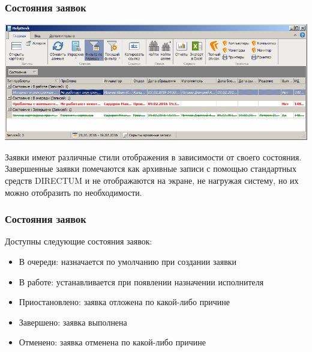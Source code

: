 \documentclass{../industrial-development}
\begin{document}
\begin{frame} \frametitle{Состояния заявок}
\centerline{\includegraphics[width=\textwidth]{pic5.png}}
\end{frame}
\lecturenotes
Заявки имеют различные стили отображения в зависимости от своего состояния. Завершенные заявки помечаются как архивные записи с помощью стандартных средств DIRECTUM и не отображаются на экране, не нагружая систему, но их можно отобразить по необходимости.

\begin{frame} \frametitle{Состояния заявок}
	Доступны следующие состояния заявок:
	\begin{itemize}
		\item В очереди: назначается по умолчанию при создании заявки
		\item В работе: устанавливается при появлении назначении исполнителя
		\item Приостановлено: заявка отложена по какой-либо причине
		\item Завершено: заявка выполнена
		\item Отменено: заявка отменена по какой-либо причине
	\end{itemize}
\end{frame}
\lecturenotes
\end{document}
